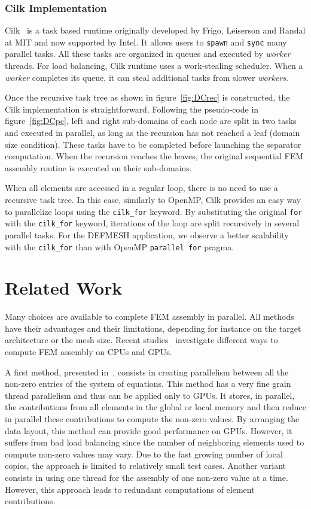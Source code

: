 \documentclass[10pt]{IOS-Book-Article}
\begin{document}
\subsubsection{Cilk Implementation}
Cilk~\cite{cilk5} is a task based runtime originally developed by Frigo, Leiserson and Randal at MIT and now supported by Intel.
It allows users to {\tt spawn} and {\tt sync} many parallel tasks.
All these tasks are organized in queues and executed by \emph{worker} threads.
For load balancing, Cilk runtime uses a work-stealing scheduler. When a \emph{worker} completes its queue, it can steal additional tasks from slower \emph{workers}.

Once the recursive task tree as shown in figure~\ref{fig:DCrec} is constructed, the Cilk implementation is straightforward.
Following the pseudo-code in figure~\ref{fig:DCpc}, left and right sub-domains of each node are split in two tasks and executed in parallel, as long as the recursion has not reached a leaf (domain size condition).
These tasks have to be completed before launching the separator computation. 
When the recursion reaches the leaves, the original sequential FEM assembly routine is executed on their sub-domains.

When all elements are accessed in a regular loop, there is no need to use a recursive task tree.
In this case, similarly to OpenMP, Cilk provides an easy way to parallelize loops using the { \tt cilk\_for} keyword.
By substituting the original {\tt for} with the {\tt cilk\_for} keyword, iterations of the loop are split recursively in several parallel tasks.
For the DEFMESH application, we observe a better scalability with the {\tt cilk\_for} than with OpenMP {\tt parallel for} pragma.

\section{Related Work}
Many choices are available to complete FEM assembly in parallel.
All methods have their advantages and their limitations, depending for instance on the target architecture or the mesh size.
Recent studies~\cite{cecka2011assembly,CPUGPUasm} investigate different ways to compute FEM assembly on CPUs and GPUs.

A first method, presented in~\cite{cecka2011assembly}, consists in creating parallelism between all the non-zero entries of the system of equations.
This method has a very fine grain thread parallelism and thus can be applied only to GPUs.
It stores, in parallel, the contributions from all elements in the global or local memory and then reduce in parallel these contributions to compute the non-zero values.
By arranging the data layout, this method can provide good performance on GPUs.
However, it suffers from bad load balancing since the number of neighboring elements used to compute non-zero values may vary.
Due to  the fast growing number of local copies, the approach is limited to relatively small test cases.
Another variant consists in using one thread for the assembly of one non-zero value at a time. However, this approach leads to redundant computations of element contributions.
\end{document}
